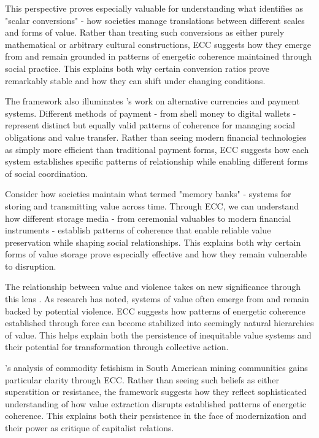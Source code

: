 This perspective proves especially valuable for understanding what \cite{guyer2004marginal} identifies as "scalar conversions" - how societies manage translations between different scales and forms of value. Rather than treating such conversions as either purely mathematical or arbitrary cultural constructions, ECC suggests how they emerge from and remain grounded in patterns of energetic coherence maintained through social practice. This explains both why certain conversion ratios prove remarkably stable and how they can shift under changing conditions.

The framework also illuminates \cite{maurer2015how}'s work on alternative currencies and payment systems. Different methods of payment - from shell money to digital wallets - represent distinct but equally valid patterns of coherence for managing social obligations and value transfer. Rather than seeing modern financial technologies as simply more efficient than traditional payment forms, ECC suggests how each system establishes specific patterns of relationship while enabling different forms of social coordination.

Consider how societies maintain what \cite{hart2000memory} termed "memory banks" - systems for storing and transmitting value across time. Through ECC, we can understand how different storage media - from ceremonial valuables to modern financial instruments - establish patterns of coherence that enable reliable value preservation while shaping social relationships. This explains both why certain forms of value storage prove especially effective and how they remain vulnerable to disruption.

The relationship between value and violence takes on new significance through this lens \cite{graeber2001toward}. As research has noted, systems of value often emerge from and remain backed by potential violence. ECC suggests how patterns of energetic coherence established through force can become stabilized into seemingly natural hierarchies of value. This helps explain both the persistence of inequitable value systems and their potential for transformation through collective action.

\cite{taussig1980devil}'s analysis of commodity fetishism in South American mining communities gains particular clarity through ECC. Rather than seeing such beliefs as either superstition or resistance, the framework suggests how they reflect sophisticated understanding of how value extraction disrupts established patterns of energetic coherence. This explains both their persistence in the face of modernization and their power as critique of capitalist relations.

